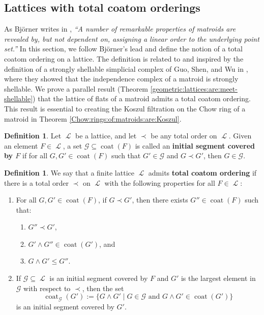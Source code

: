 \documentclass[11pt, reqno]{amsart}
\DeclareMathOperator{\coat}{coat}
\DeclareMathOperator{\LL}{\mathcal{L}}
\DeclareMathOperator{\rk}{rk}
\newcommand{\term}[1]{\textbf{\textsf{#1}}}
\theoremstyle{definition}
\newtheorem{defn}[thm]{Definition}
\numberwithin{equation}{section}
\numberwithin{table}{section}
\begin{document}
\begin{spacing}{1.1}
\section{Lattices with total coatom orderings}\label{Smeetshellable}

As Bj\"orner writes in \cite[p. 232]{Bjo92}, \emph{``A number of remarkable properties of matroids are revealed by, but not dependent on, assigning a linear order to the underlying point set.''}
In this section, we follow Bj\"orner's lead and define the notion of a total coatom ordering on a lattice.  The definition is related to and inspired by the definition of a strongly shellable simplicial complex of Guo, Shen, and Wu in \cite{GSW19}, where they showed that the independence complex of a matroid is strongly shellable.  We prove a parallel result (Theorem \ref{geometric:lattices:are:meet-shellable}) that the lattice of flats of a matroid admits a total coatom ordering.  This result is essential to creating the Koszul filtration on the Chow ring of a matroid in Theorem \ref{Chow:rings:of:matroids:are:Koszul}.  

\begin{defn}
Let $\LL$ be a lattice, and let $\prec$ be any total order on $\LL$.  Given an element $F \in \LL$, a set $\mathcal{G} \subseteq \coat(F)$ is called an \term{initial segment covered by $F$} if for all $G, G' \in \coat(F)$ such that $G' \in \mathcal{G}$ and $G \prec G'$, then $G \in \mathcal{G}$.
\end{defn}

\begin{defn} \label{meet-shellable}
We say that a finite lattice $\LL$ admits \term{total coatom ordering} if there is a total order $\prec$ on $\LL$ with the following properties for all $F \in \LL$:
\begin{enumerate}[label = (\roman*)]
\item  \label{locally:rooted}
For all $G, G' \in \coat(F)$, if $G \prec G'$, then there exists $G'' \in \coat(F)$ such that:
\begin{enumerate}[label = (i.\alph*)]
\item  $G'' \prec G'$, 
\item $G' \wedge G'' \in \coat(G')$, and 
\item $G \wedge G' \leq G''$.
\end{enumerate}
\item \label{good:restricted:covers}
If $\mathcal{G} \subseteq \LL$ is an initial segment covered by $F$ and $G'$ is the largest element in $\mathcal{G}$ with respect to $\prec$, then the set 
\[
\coat_\mathcal{G}(G') := \{ G \wedge G' \mid G \in \mathcal{G} \text{ and } G \wedge G' \in \coat(G') \}
\]
is an initial segment covered by $G'$. 
\end{enumerate}
\end{defn}


\end{spacing}
\end{document}
